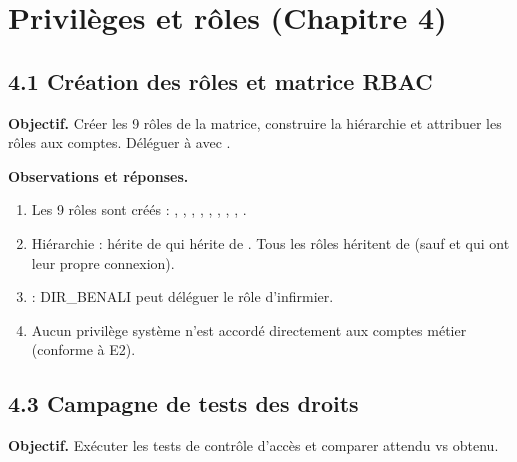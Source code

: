 \section{Privilèges et rôles (Chapitre 4)}

\subsection{4.1 Création des rôles et matrice RBAC}
\textbf{Objectif.} Créer les 9 rôles de la matrice, construire la hiérarchie et attribuer les rôles aux comptes. Déléguer  à  avec .

 

\textbf{Observations et réponses.}
\begin{enumerate}
  \item Les 9 rôles sont créés : , , , , , , , , .
  \item Hiérarchie :  hérite de  qui hérite de . Tous les rôles héritent de  (sauf  et  qui ont leur propre connexion).
  \item {} : DIR\_BENALI peut déléguer le rôle d'infirmier.
  \item Aucun privilège système n'est accordé directement aux comptes métier (conforme à E2).
\end{enumerate}

\subsection{4.3 Campagne de tests des droits}
\textbf{Objectif.} Exécuter les tests de contrôle d'accès et comparer attendu vs obtenu.


